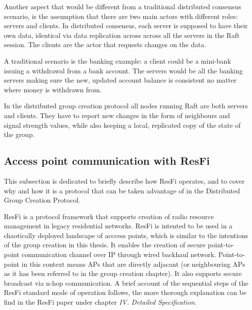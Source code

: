Another aspect that would be different from a traditional distributed consensus scenario, is the assumption that there are two main actors with different roles: servers and clients.
In distributed consensus, each server is supposed to have their own data, identical via data replication across across all the servers in the Raft session. The clients are the actor that requests 
changes on the data.

A traditional scenario is the banking example: a client could be a mini-bank issuing a withdrawal from a bank account. The servers would be all the banking servers making sure the new,
updated account balance is consistent no matter where money is withdrawn from. 

In the distributed group creation protocol all nodes running Raft are both servers and clients. They have to report new changes in the form of neighbours and signal strength values,
while also keeping a local, replicated copy of the state of the group.

\subsection{Access point communication with ResFi}
This subsection is dedicated to briefly describe how ResFi operates, and to cover why and how it is a protocol that can be taken advantage of in the Distributed Group Creation Protocol. 

ResFi is a protocol framework that supports creation of radio resource management in legacy residential networks. ResFi is intented to be used in  a chaotically deployed landscape of acccess points,
which is similar to the intentions of the group creation in this thesis. It enables the creation of secure point-to-point communication channel over IP through wired backhaul network. 
Point-to-point in this context means APs that are directly adjacant (or neighbouring APs as it has been referred to in the group creation chapter).
It also supports secure broadcast via n-hop communication. A brief account of the sequential steps of the ResFi standard mode of operation follows,
the more thorough explanation can be find in the ResFi paper \cite{resfi} under chapter \textit{IV. Detailed Specification}.

